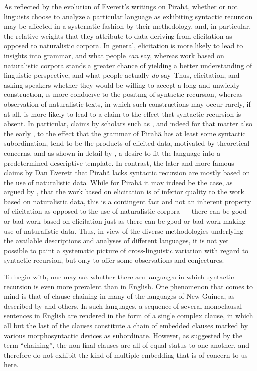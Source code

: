 \documentclass[output=paper,colorlinks,citecolor=brown
]{langscibook}
\begin{document}
As reflected by the evolution of Everett's writings on Pirahã, whether or not linguists choose to analyze a particular language as exhibiting syntactic recursion may be affected in a systematic fashion by their methodology, and, in particular, the relative weights that they attribute to data deriving from elicitation as opposed to naturalistic corpora.  In general, elicitation is more likely to lead to insights into grammar, and what people \textit{can} say, whereas work based on naturalistic corpora stands a greater chance of yielding a better understanding of linguistic perspective, and what people actually \textit{do} say.  Thus, elicitation, and asking speakers whether they would be willing to accept a long and unwieldy construction, is more conducive to the positing of syntactic recursion, whereas observation of naturalistic texts, in which such constructions may occur rarely, if at all, is more likely to lead to a claim to the effect that syntactic recursion is absent.  In particular, claims by scholars such as \citet{sandalo2018selfembedded}, and indeed for that matter also the early \citet{everett1986piraha}, to the effect that the grammar of Pirahã has at least some syntactic subordination, tend to be the products of elicited data, motivated by theoretical concerns, and as shown in detail by , a desire to fit the language into a predetermined descriptive template.  In contrast, the later and more famous claims by Dan Everett that Pirahã lacks syntactic recursion are mostly based on the use of naturalistic data.  While for Pirahã it may indeed be the case, as argued by , that the work based on elicitation is of inferior quality to the work based on naturalistic data, this is a contingent fact and not an inherent property of elicitation as opposed to the use of naturalistic corpora — there can be good or bad work based on elicitation just as there can be good or bad work making use of naturalistic data.  Thus, in view of the diverse methodologies underlying the available descriptions and analyses of different languages, it is not yet possible to paint a systematic picture of cross-linguistic variation with regard to syntactic recursion, but only to offer some observations and conjectures.

To begin with, one may ask whether there are languages in which syntactic recursion is even more prevalent than in English.  One phenomenon that comes to mind is that of clause chaining in many of the languages of New Guinea, as described by \citet{foley2010clause} and others.  In such languages, a sequence of several monoclausal sentences in English are rendered in the form of a single complex clause, in which all but the last of the clauses constitute a chain of embedded clauses marked by various morphosyntactic devices as subordinate.  However, as suggested by the term ``chaining'', the non-final clauses are all of equal status to one another, and therefore do not exhibit the kind of multiple embedding that is of concern to us here.
\end{document}
